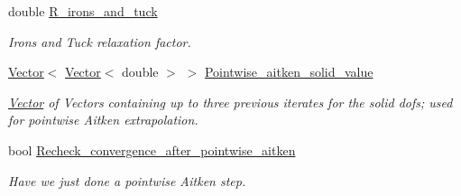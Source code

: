\begin{DoxyCompactItemize}
double \hyperlink{classoomph_1_1SegregatableFSIProblem_a7568103d53df9c84b86fdf41885cf289}{R\+\_\+irons\+\_\+and\+\_\+tuck}
\begin{DoxyCompactList}\small\item\em Irons and Tuck relaxation factor. \end{DoxyCompactList}\item 
\hyperlink{classoomph_1_1Vector}{Vector}$<$ \hyperlink{classoomph_1_1Vector}{Vector}$<$ double $>$ $>$ \hyperlink{classoomph_1_1SegregatableFSIProblem_aa193977e4617aee9906e59bdd31f2263}{Pointwise\+\_\+aitken\+\_\+solid\+\_\+value}
\begin{DoxyCompactList}\small\item\em \hyperlink{classoomph_1_1Vector}{Vector} of Vectors containing up to three previous iterates for the solid dofs; used for pointwise Aitken extrapolation. \end{DoxyCompactList}\item 
bool \hyperlink{classoomph_1_1SegregatableFSIProblem_a0cef79bdf839668a2145e9fe5f77a5f2}{Recheck\+\_\+convergence\+\_\+after\+\_\+pointwise\+\_\+aitken}
\begin{DoxyCompactList}\small\item\em Have we just done a pointwise Aitken step. \end{DoxyCompactList}\end{DoxyCompactItemize}
